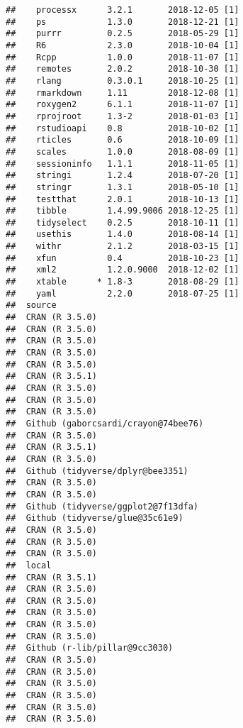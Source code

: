 \documentclass[]{elsarticle} %
\begin{document}
\begin{verbatim}
##    processx      3.2.1       2018-12-05 [1]
##    ps            1.3.0       2018-12-21 [1]
##    purrr         0.2.5       2018-05-29 [1]
##    R6            2.3.0       2018-10-04 [1]
##    Rcpp          1.0.0       2018-11-07 [1]
##    remotes       2.0.2       2018-10-30 [1]
##    rlang         0.3.0.1     2018-10-25 [1]
##    rmarkdown     1.11        2018-12-08 [1]
##    roxygen2      6.1.1       2018-11-07 [1]
##    rprojroot     1.3-2       2018-01-03 [1]
##    rstudioapi    0.8         2018-10-02 [1]
##    rticles       0.6         2018-10-09 [1]
##    scales        1.0.0       2018-08-09 [1]
##    sessioninfo   1.1.1       2018-11-05 [1]
##    stringi       1.2.4       2018-07-20 [1]
##    stringr       1.3.1       2018-05-10 [1]
##    testthat      2.0.1       2018-10-13 [1]
##    tibble        1.4.99.9006 2018-12-25 [1]
##    tidyselect    0.2.5       2018-10-11 [1]
##    usethis       1.4.0       2018-08-14 [1]
##    withr         2.1.2       2018-03-15 [1]
##    xfun          0.4         2018-10-23 [1]
##    xml2          1.2.0.9000  2018-12-02 [1]
##    xtable      * 1.8-3       2018-08-29 [1]
##    yaml          2.2.0       2018-07-25 [1]
##  source                             
##  CRAN (R 3.5.0)                     
##  CRAN (R 3.5.0)                     
##  CRAN (R 3.5.0)                     
##  CRAN (R 3.5.0)                     
##  CRAN (R 3.5.0)                     
##  CRAN (R 3.5.1)                     
##  CRAN (R 3.5.0)                     
##  CRAN (R 3.5.0)                     
##  CRAN (R 3.5.0)                     
##  Github (gaborcsardi/crayon@74bee76)
##  CRAN (R 3.5.0)                     
##  CRAN (R 3.5.1)                     
##  CRAN (R 3.5.0)                     
##  Github (tidyverse/dplyr@bee3351)   
##  CRAN (R 3.5.0)                     
##  CRAN (R 3.5.0)                     
##  Github (tidyverse/ggplot2@7f13dfa) 
##  Github (tidyverse/glue@35c61e9)    
##  CRAN (R 3.5.0)                     
##  CRAN (R 3.5.0)                     
##  CRAN (R 3.5.0)                     
##  local                              
##  CRAN (R 3.5.1)                     
##  CRAN (R 3.5.0)                     
##  CRAN (R 3.5.0)                     
##  CRAN (R 3.5.0)                     
##  CRAN (R 3.5.0)                     
##  CRAN (R 3.5.0)                     
##  Github (r-lib/pillar@9cc3030)      
##  CRAN (R 3.5.0)                     
##  CRAN (R 3.5.0)                     
##  CRAN (R 3.5.0)                     
##  CRAN (R 3.5.0)                     
##  CRAN (R 3.5.0)                     
##  CRAN (R 3.5.0)                     

\end{verbatim}
\end{document}
